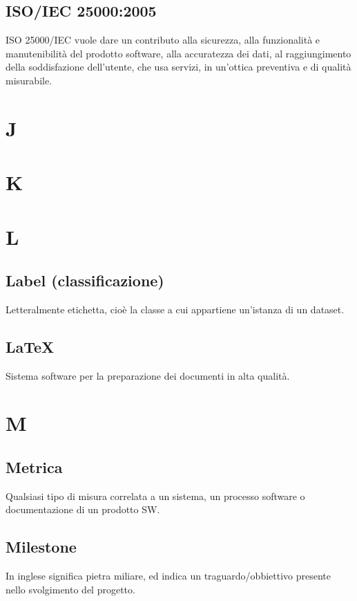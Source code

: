 \documentclass{classes/base}
\begin{document}
        \subsection*{ISO/IEC 25000:2005}
        ISO 25000/IEC vuole dare un contributo alla sicurezza, alla funzionalità e manutenibilità del prodotto software, alla accuratezza dei dati, al raggiungimento della soddisfazione dell'utente, che usa servizi, in un'ottica preventiva e di qualità misurabile.
        
        \newpage  
    \section{J}
    \newpage  
    \section{K}
    \newpage  
    \section{L}
        \subsection*{Label (classificazione)}
        Letteralmente etichetta, cioè la classe a cui appartiene un'istanza di un dataset.
        
        \subsection*{LaTeX}
        Sistema software per la preparazione dei documenti in alta qualità.

    \newpage  
    \section{M} 
        \subsection*{Metrica}
        Qualsiasi tipo di misura correlata a un sistema, un processo software  o  documentazione  di  un  prodotto  SW. 

        \subsection*{Milestone}
        In inglese significa pietra miliare, ed indica un traguardo/obbiettivo presente nello svolgimento del progetto.
        
\end{document}
